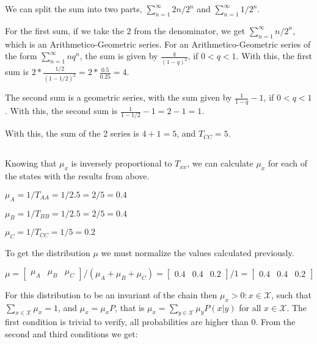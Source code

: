 \documentclass{article}
\begin{document}
We can split the sum into two parts, $\sum_{n=1}^{\infty} 2n / 2^n$ and $\sum_{n=1}^{\infty} 1 / 2^n$.

For the first sum, if we take the 2 from the denominator, we get $\sum_{n=1}^{\infty} n / 2^{n}$, which is an Arithmetico-Geometric series.
For an Arithmetico-Geometric series of the form $\sum_{n=1}^{\infty} nq^{n}$, the sum is given by $\frac{q}{(1 - q)^2}$, if $0 < q < 1$.
With this, the first sum is $ 2 * \frac{1/2}{(1 - 1/2)^2} = 2 * \frac{0.5}{0.25} = 4$.

The second sum is a geometric series, with the sum given by $\frac{1}{1 - q} - 1$, if $0 < q < 1$.
With this, the second sum is $\frac{1}{1 - 1/2} - 1 = 2 - 1 = 1$.

\bigskip

With this, the sum of the 2 series is $4 + 1 = 5$, and $T_{CC} = 5$.

\subsection{}

Knowing that $\mu_{x}$ is inversely proportional to $T_{xx}$, we can calculate $\mu_{x}$ for each of the states with the results from above.

\bigskip

$\mu_{A} = 1 / T_{AA} = 1 / 2.5 = 2 / 5 = 0.4$

$\mu_{B} = 1 / T_{BB} = 1 / 2.5 = 2 / 5 = 0.4$

$\mu_{C} = 1 / T_{CC} = 1 / 5 = 0.2$

\bigskip

To get the distribution $\mu$ we must normalize the values calculated previously.

\bigskip

$\mu = \begin{bmatrix} \mu_{A} & \mu_{B} & \mu_{C} \end{bmatrix} / (\mu_{A} + \mu_{B} + \mu_{C}) = \begin{bmatrix} 0.4 & 0.4 & 0.2 \end{bmatrix} / 1 = \begin{bmatrix} 0.4 & 0.4 & 0.2 \end{bmatrix}$

\bigskip

For this distribution to be an invariant of the chain then $\mu_{x} > 0 : x \in \mathcal{X}$, such that 
$\sum_{x \in \mathcal{X}} \mu_{x} = 1$, and $\mu_{x} = \mu_{x}P$, that is $\mu_{x} = \sum_{y \in \mathcal{X}} \mu_{y}P(x | y)$ 
for all $x \in \mathcal{X}$.
The first condition is trivial to verify, all probabilities are higher than 0.
From the second and third conditions we get:
\end{document}
